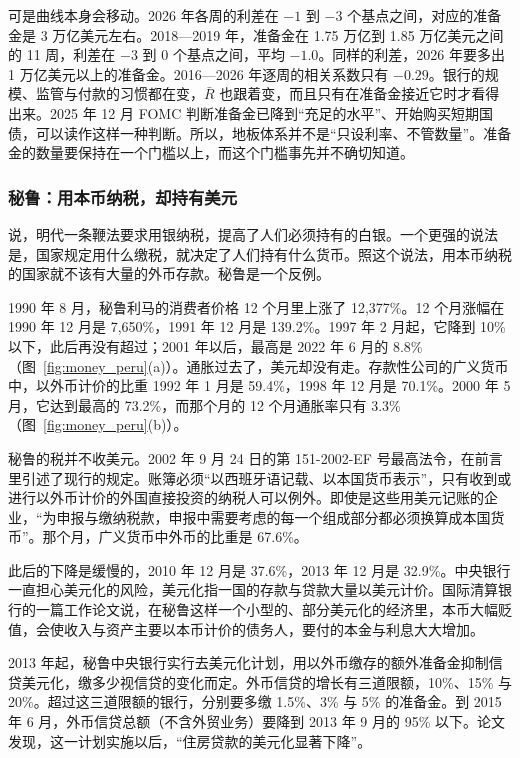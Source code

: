 可是曲线本身会移动。2026 年各周的利差在 $-1$ 到 $-3$ 个基点之间，对应的准备金是 3 万亿美元左右。2018—2019 年，准备金在 1.75 万亿到 1.85 万亿美元之间的 11 周，利差在 $-3$ 到 0 个基点之间，平均 $-1.0$。同样的利差，2026 年要多出 1 万亿美元以上的准备金。2016—2026 年逐周的相关系数只有 $-0.29$。银行的规模、监管与付款的习惯都在变，$\bar R$ 也跟着变，而且只有在准备金接近它时才看得出来。2025 年 12 月 FOMC 判断准备金已降到“充足的水平”、开始购买短期国债，可以读作这样一种判断。所以，地板体系并不是“只设利率、不管数量”。准备金的数量要保持在一个门槛以上，而这个门槛事先并不确切知道。

\subsubsection{秘鲁：用本币纳税，却持有美元}
说，明代一条鞭法要求用银纳税，提高了人们必须持有的白银。一个更强的说法是，国家规定用什么缴税，就决定了人们持有什么货币。照这个说法，用本币纳税的国家就不该有大量的外币存款。秘鲁是一个反例。

1990 年 8 月，秘鲁利马的消费者价格 12 个月里上涨了 12,377\%。12 个月涨幅在 1990 年 12 月是 7,650\%，1991 年 12 月是 139.2\%。1997 年 2 月起，它降到 10\% 以下，此后再没有超过；2001 年以后，最高是 2022 年 6 月的 8.8\%（图~\ref{fig:money_peru}(a)）\cite{bcrp2026}。通胀过去了，美元却没有走。存款性公司的广义货币中，以外币计价的比重 1992 年 1 月是 59.4\%，1998 年 12 月是 70.1\%。2000 年 5 月，它达到最高的 73.2\%，而那个月的 12 个月通胀率只有 3.3\%（图~\ref{fig:money_peru}(b)）\cite{bcrp2026}。

秘鲁的税并不收美元。2002 年 9 月 24 日的第 151-2002-EF 号最高法令，在前言里引述了现行的规定。账簿必须“以西班牙语记载、以本国货币表示”，只有收到或进行以外币计价的外国直接投资的纳税人可以例外\cite{peru2002}。即使是这些用美元记账的企业，“为申报与缴纳税款，申报中需要考虑的每一个组成部分都必须换算成本国货币”\cite{peru2002}。那个月，广义货币中外币的比重是 67.6\%\cite{bcrp2026}。

此后的下降是缓慢的，2010 年 12 月是 37.6\%，2013 年 12 月是 32.9\%。中央银行一直担心美元化的风险，美元化指一国的存款与贷款大量以美元计价。国际清算银行的一篇工作论文说，在秘鲁这样一个小型的、部分美元化的经济里，本币大幅贬值，会使收入与资产主要以本币计价的债务人，要付的本金与利息大大增加\cite{minaya2017}。

2013 年起，秘鲁中央银行实行去美元化计划，用以外币缴存的额外准备金抑制信贷美元化，缴多少视信贷的变化而定。外币信贷的增长有三道限额，10\%、15\% 与 20\%。超过这三道限额的银行，分别要多缴 1.5\%、3\% 与 5\% 的准备金。到 2015 年 6 月，外币信贷总额（不含外贸业务）要降到 2013 年 9 月的 95\% 以下\cite{minaya2017}。论文发现，这一计划实施以后，“住房贷款的美元化显著下降”\cite{minaya2017}。

